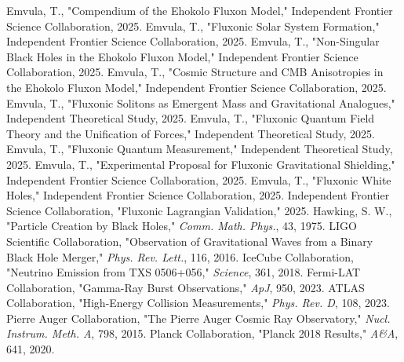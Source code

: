 \documentclass[11pt]{article}
\begin{document}



\begin{thebibliography}{9}
Emvula, T., "Compendium of the Ehokolo Fluxon Model," Independent Frontier Science Collaboration, 2025.
Emvula, T., "Fluxonic Solar System Formation," Independent Frontier Science Collaboration, 2025.
Emvula, T., "Non-Singular Black Holes in the Ehokolo Fluxon Model," Independent Frontier Science Collaboration, 2025.
Emvula, T., "Cosmic Structure and CMB Anisotropies in the Ehokolo Fluxon Model," Independent Frontier Science Collaboration, 2025.
Emvula, T., "Fluxonic Solitons as Emergent Mass and Gravitational Analogues," Independent Theoretical Study, 2025.
Emvula, T., "Fluxonic Quantum Field Theory and the Unification of Forces," Independent Theoretical Study, 2025.
Emvula, T., "Fluxonic Quantum Measurement," Independent Theoretical Study, 2025.
Emvula, T., "Experimental Proposal for Fluxonic Gravitational Shielding," Independent Frontier Science Collaboration, 2025.
Emvula, T., "Fluxonic White Holes," Independent Frontier Science Collaboration, 2025.
Independent Frontier Science Collaboration, "Fluxonic Lagrangian Validation," 2025.
Hawking, S. W., "Particle Creation by Black Holes," \textit{Comm. Math. Phys.}, 43, 1975.
LIGO Scientific Collaboration, "Observation of Gravitational Waves from a Binary Black Hole Merger," \textit{Phys. Rev. Lett.}, 116, 2016.
IceCube Collaboration, "Neutrino Emission from TXS 0506+056," \textit{Science}, 361, 2018.
Fermi-LAT Collaboration, "Gamma-Ray Burst Observations," \textit{ApJ}, 950, 2023.
ATLAS Collaboration, "High-Energy Collision Measurements," \textit{Phys. Rev. D}, 108, 2023.
Pierre Auger Collaboration, "The Pierre Auger Cosmic Ray Observatory," \textit{Nucl. Instrum. Meth. A}, 798, 2015.
Planck Collaboration, "Planck 2018 Results," \textit{A\&A}, 641, 2020.
\end{thebibliography}
\end{document}
